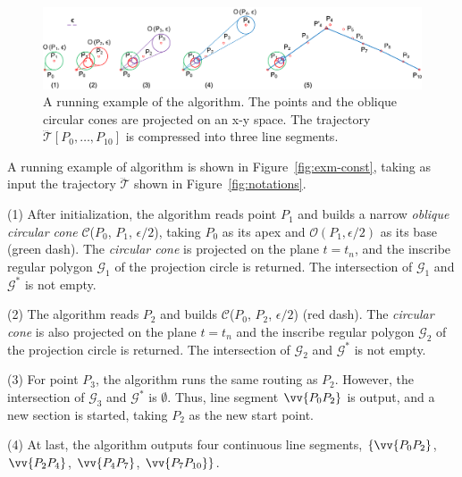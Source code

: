 \begin{figure}[tb!]
\centering
\includegraphics[scale=0.8]{figures/Fig-conesta.png}
\vspace{-1ex}
\caption{\small A running example of the \cista algorithm. The points and the oblique circular cones are projected on an x-y space. The trajectory $\dddot{\mathcal{T}}[P_0, \ldots, P_{10}]$ is compressed into three line segments.}
\vspace{-2ex}
\label{fig:exm-consta}
\end{figure}


\begin{example}
\label{exm-alg-conest}
A running example of algorithm \cist is shown in Figure~\ref{fig:exm-const},  taking as input the trajectory $\dddot{\mathcal{T}}$ shown in Figure~\ref{fig:notations}.

\ni (1) After initialization, the \cist algorithm reads point $P_1$ and builds a narrow \emph{oblique circular cone} $\mathcal{C}$($P_0$, $P_{1}$, $\epsilon/2$), taking $P_0$ as its apex and $\mathcal{O}(P_1, \epsilon/2)$ as its base (green dash). The \emph{circular cone} is projected on the plane $t=t_n$, and the inscribe regular polygon $\mathcal{G}_1$ of the projection circle is returned. The intersection of $\mathcal{G}_1$ and $\mathcal{G}^*$ is not empty.

\ni (2) The algorithm reads $P_2$ and builds $\mathcal{C}$($P_0$, $P_{2}$, $\epsilon/2$) (red dash). The \emph{circular cone} is also projected on the plane $t=t_n$ and the inscribe regular polygon $\mathcal{G}_2$ of the projection circle is returned. The intersection of $\mathcal{G}_2$ and $\mathcal{G}^*$ is not empty.

\ni (3) For point $P_3$, the algorithm runs the same routing as $P_2$. However, the intersection of $\mathcal{G}_3$ and $\mathcal{G}^*$ is $\emptyset$. Thus, line segment $\vv{P_0P_2}$ is output, and a new section is started, taking $P_2$ as the new start point.

\ni (4) At last, the algorithm outputs four continuous line segments, \ie $\{\vv{P_0P_2}$, $\vv{P_2P_4}$, $\vv{P_4P_{7}}$, $\vv{P_7P_{10}}\}$.
\end{example}





